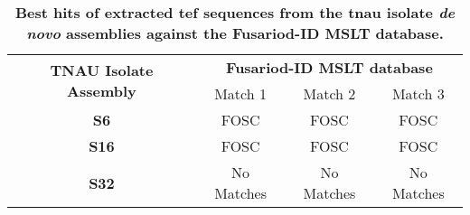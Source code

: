 \begin{table}[]
\centering
\captionsetup{width=\linewidth} 
\caption[\Ac{tnau}\acf{tef} \acf{ncbi} and Fusariod-ID MSLT database searches.]{\textbf{Best hits of extracted \acf{tef} sequences from the \acf{tnau} isolate \textit{de novo} assemblies against the Fusariod-ID MSLT database.}}
\label{tab:Tef1-MLSTdb}
\begin{tabular}{cccc}
\multirow{2}{*}{\textbf{TNAU Isolate Assembly}} & \multicolumn{3}{c}{\textbf{Fusariod-ID MSLT database}}                                     \\ \cline{2-4} 
                                                & Match 1                      & Match 2                      & Match 3                      \\ \hline
\textbf{S6}                 & \ac{FOSC}& \ac{FOSC}& \ac{FOSC}\\
\textbf{S16}                                    & \ac{FOSC} & \ac{FOSC} & \ac{FOSC} \\
\textbf{S32}                        & No Matches                   & No Matches                   & No Matches                  
\end{tabular}%
\end{table}
